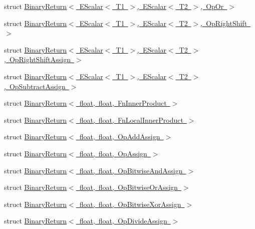 \begin{DoxyCompactItemize}
\item 
struct \mbox{\hyperlink{structENSEM_1_1BinaryReturn_3_01EScalar_3_01T1_01_4_00_01EScalar_3_01T2_01_4_00_01OpOr_01_4}{Binary\+Return$<$ E\+Scalar$<$ T1 $>$, E\+Scalar$<$ T2 $>$, Op\+Or $>$}}
\item 
struct \mbox{\hyperlink{structENSEM_1_1BinaryReturn_3_01EScalar_3_01T1_01_4_00_01EScalar_3_01T2_01_4_00_01OpRightShift_01_4}{Binary\+Return$<$ E\+Scalar$<$ T1 $>$, E\+Scalar$<$ T2 $>$, Op\+Right\+Shift $>$}}
\item 
struct \mbox{\hyperlink{structENSEM_1_1BinaryReturn_3_01EScalar_3_01T1_01_4_00_01EScalar_3_01T2_01_4_00_01OpRightShiftAssign_01_4}{Binary\+Return$<$ E\+Scalar$<$ T1 $>$, E\+Scalar$<$ T2 $>$, Op\+Right\+Shift\+Assign $>$}}
\item 
struct \mbox{\hyperlink{structENSEM_1_1BinaryReturn_3_01EScalar_3_01T1_01_4_00_01EScalar_3_01T2_01_4_00_01OpSubtractAssign_01_4}{Binary\+Return$<$ E\+Scalar$<$ T1 $>$, E\+Scalar$<$ T2 $>$, Op\+Subtract\+Assign $>$}}
\item 
struct \mbox{\hyperlink{structENSEM_1_1BinaryReturn_3_01float_00_01float_00_01FnInnerProduct_01_4}{Binary\+Return$<$ float, float, Fn\+Inner\+Product $>$}}
\item 
struct \mbox{\hyperlink{structENSEM_1_1BinaryReturn_3_01float_00_01float_00_01FnLocalInnerProduct_01_4}{Binary\+Return$<$ float, float, Fn\+Local\+Inner\+Product $>$}}
\item 
struct \mbox{\hyperlink{structENSEM_1_1BinaryReturn_3_01float_00_01float_00_01OpAddAssign_01_4}{Binary\+Return$<$ float, float, Op\+Add\+Assign $>$}}
\item 
struct \mbox{\hyperlink{structENSEM_1_1BinaryReturn_3_01float_00_01float_00_01OpAssign_01_4}{Binary\+Return$<$ float, float, Op\+Assign $>$}}
\item 
struct \mbox{\hyperlink{structENSEM_1_1BinaryReturn_3_01float_00_01float_00_01OpBitwiseAndAssign_01_4}{Binary\+Return$<$ float, float, Op\+Bitwise\+And\+Assign $>$}}
\item 
struct \mbox{\hyperlink{structENSEM_1_1BinaryReturn_3_01float_00_01float_00_01OpBitwiseOrAssign_01_4}{Binary\+Return$<$ float, float, Op\+Bitwise\+Or\+Assign $>$}}
\item 
struct \mbox{\hyperlink{structENSEM_1_1BinaryReturn_3_01float_00_01float_00_01OpBitwiseXorAssign_01_4}{Binary\+Return$<$ float, float, Op\+Bitwise\+Xor\+Assign $>$}}
\item 
struct \mbox{\hyperlink{structENSEM_1_1BinaryReturn_3_01float_00_01float_00_01OpDivideAssign_01_4}{Binary\+Return$<$ float, float, Op\+Divide\+Assign $>$}}

\end{DoxyCompactItemize}
